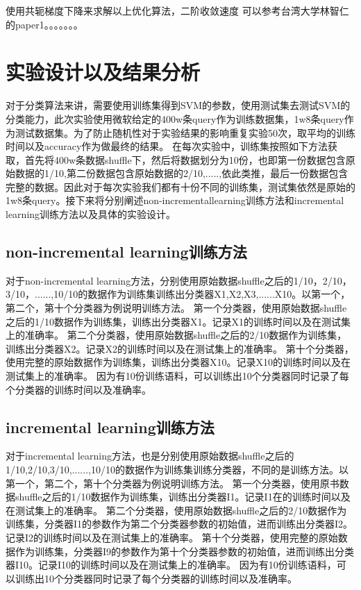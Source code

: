 \documentclass[master]{njuthesis}
\begin{document}
使用共轭梯度下降来求解以上优化算法，二阶收敛速度
可以参考台湾大学林智仁的paper1。。。。。。。

\section{实验设计以及结果分析}

    对于分类算法来讲，需要使用训练集得到SVM的参数，使用测试集去测试SVM的分类能力，此次实验使用微软给定的400w条query作为训练数据集，1w8条query作为测试数据集。为了防止随机性对于实验结果的影响重复实验50次，取平均的训练时间以及accuracy作为做最终的结果。
    在每次实验中，训练集按照如下方法获取，首先将400w条数据shuffle下，然后将数据划分为10份，也即第一份数据包含原始数据的1/10,第二份数据包含原始数据的2/10,.....,依此类推，最后一份数据包含完整的数据。因此对于每次实验我们都有十份不同的训练集，测试集依然是原始的1w8条query。接下来将分别阐述non-incrementallearning训练方法和incremental learning训练方法以及具体的实验设计。

\subsection{non-incremental learning训练方法}

    对于non-incremental learning方法，分别使用原始数据shuffle之后的1/10，2/10，3/10，......,10/10的数据作为训练集训练出分类器X1,X2,X3,......X10。以第一个，第二个，第十个分类器为例说明训练方法。
   第一个分类器，使用原始数据shuffle之后的1/10数据作为训练集，训练出分类器X1。记录X1的训练时间以及在测试集上的准确率。
   第二个分类器，使用原始数据shuffle之后的2/10数据作为训练集，训练出分类器X2。记录X2的训练时间以及在测试集上的准确率。
   第十个分类器，使用完整的原始数据作为训练集，训练出分类器X10。记录X10的训练时间以及在测试集上的准确率。
   因为有10份训练语料，可以训练出10个分类器同时记录了每个分类器的训练时间以及准确率。

\subsection{incremental learning训练方法}
    
   对于incremental learning方法，也是分别使用原始数据shuffle之后的1/10,2/10,3/10,......,10/10的数据作为训练集训练分类器，不同的是训练方法。以第一个，第二个，第十个分类器为例说明训练方法。
   第一个分类器，使用原书数据shuffle之后的1/10数据作为训练集，训练出分类器I1。记录I1在的训练时间以及在测试集上的准确率。
   第二个分类器，使用原始数据shuffle之后的2/10数据作为训练集，分类器I1的参数作为第二个分类器参数的初始值，进而训练出分类器I2。记录I2的训练时间以及在测试集上的准确率。
   第十个分类器，使用完整的原始数据作为训练集，分类器I9的参数作为第十个分类器参数的初始值，进而训练出分类器I10。记录I10的训练时间以及在测试集上的准确率。
   因为有10份训练语料，可以训练出10个分类器同时记录了每个分类器的训练时间以及准确率。
\end{document}
